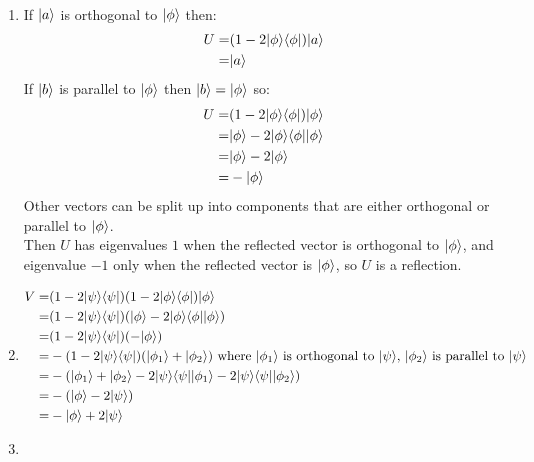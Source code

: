 \documentclass{assignment}
\begin{document}
\begin{problemlist}
  \pbitem
  \begin{problem}
  \end{problem}
  \begin{answer}
    \\
    \begin{enumerate}
    \item
      If $\ket{a}$ is orthogonal to $\ket{\phi}$ then:
      \begin{align*}
        U =& (1 - 2 \ket{\phi}\bra{\phi})\ket{a}\\
        =& \ket{a}
      \end{align*}
      If $\ket{b}$ is parallel to $\ket{\phi}$ then $\ket{b}=\ket{\phi}$ so:
      \begin{align*}
        U =& (1 - 2 \ket{\phi}\bra{\phi})\ket{\phi}\\
        =& \ket{\phi} - 2 \ket{\phi}\bra{\phi}\ket{\phi}\\
        =& \ket{\phi} - 2 \ket{\phi}\\
        =& -\ket{\phi}
      \end{align*}
      Other vectors can be split up into components that are either orthogonal or parallel to $\ket{\phi}$.\\
      Then $U$ has eigenvalues $1$ when the reflected vector is orthogonal to $\ket{\phi}$, and eigenvalue $-1$ only when the reflected vector is $\ket{\phi}$, so $U$ is a reflection.
    \item
      \begin{align*}
        V =& (1-2\ket{\psi}\bra{\psi})(1-2\ket{\phi}\bra{\phi})\ket{\phi}\\
        =& (1-2\ket{\psi}\bra{\psi})(\ket{\phi}-2\ket{\phi}\bra{\phi}\ket{\phi})\\
        =& (1-2\ket{\psi}\bra{\psi})(-\ket{\phi})\\
        =& -(1-2\ket{\psi}\bra{\psi})(\ket{\phi_1}+\ket{\phi_2}) \text{ where }\ket{\phi_1}\text{ is orthogonal to }\ket{\psi}\text{, }\ket{\phi_2}\text{ is parallel to }\ket{\psi}\\
        =& -(\ket{\phi_1} + \ket{\phi_2} - 2\ket{\psi}\bra{\psi}\ket{\phi_1}- 2\ket{\psi}\bra{\psi}\ket{\phi_2})\\
        =& -(\ket{\phi} - 2\ket{\psi})\\
        =& -\ket{\phi} + 2\ket{\psi}\\
      \end{align*}
    \item
      \begin{align*}

\end{align*}
\end{enumerate}
\end{answer}
\end{problemlist}
\end{document}
